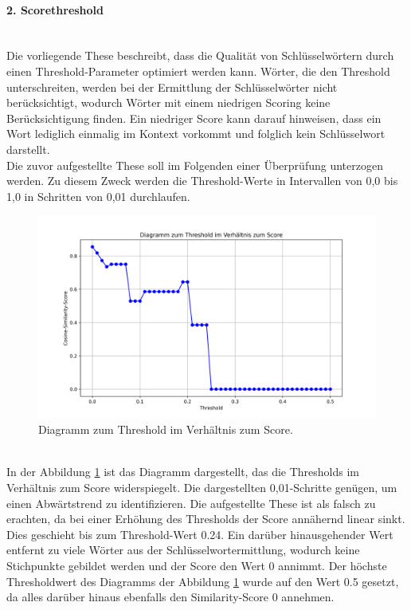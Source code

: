 \paragraph{2. Scorethreshold}\mbox{}\\
Die vorliegende These beschreibt, dass die Qualität von Schlüsselwörtern durch einen Threshold-Parameter optimiert werden kann. Wörter, die den Threshold unterschreiten, werden bei der Ermittlung der Schlüsselwörter nicht berücksichtigt, wodurch Wörter mit einem niedrigen Scoring keine Berücksichtigung finden. Ein niedriger Score kann darauf hinweisen, dass ein Wort lediglich einmalig im Kontext vorkommt und folglich kein Schlüsselwort darstellt.\\

Die zuvor aufgestellte These soll im Folgenden einer Überprüfung unterzogen werden. Zu diesem Zweck werden die Threshold-Werte in Intervallen von 0,0 bis 1,0 in Schritten von 0,01 durchlaufen.
\begin{figure}[H]
	\centering  
	\includegraphics[width=\linewidth]{plot/e2-threshold-score.png}
	\caption{Diagramm zum Threshold im Verhältnis zum Score.}
	\label{fig:thresholdvsscore}
\end{figure}\mbox{} \\
In der Abbildung \ref{fig:thresholdvsscore} ist das Diagramm dargestellt, das die Thresholds im Verhältnis zum Score widerspiegelt. Die dargestellten 0,01-Schritte genügen, um einen Abwärtstrend zu identifizieren. Die aufgestellte These ist als falsch zu erachten, da bei einer Erhöhung des Thresholds der Score annähernd linear sinkt. Dies geschieht bis zum Threshold-Wert 0.24. Ein darüber hinausgehender Wert entfernt zu viele Wörter aus der Schlüsselwortermittlung, wodurch keine Stichpunkte gebildet werden und der Score den Wert 0 annimmt. Der höchste Thresholdwert des Diagramms der Abbildung \ref{fig:thresholdvsscore} wurde auf den Wert 0.5 gesetzt, da alles darüber hinaus ebenfalls den Similarity-Score 0 annehmen.
